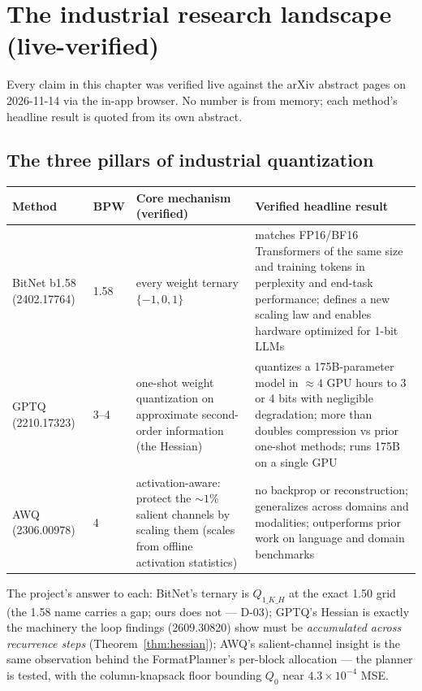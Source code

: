 \chapter{The industrial research landscape (live-verified)}

Every claim in this chapter was verified live against the arXiv abstract pages on 2026-11-14
via the in-app browser. No number is from memory; each method's headline result is quoted
from its own abstract.

\section{The three pillars of industrial quantization}

\begin{tabular}{@{}p{2.1cm}p{1.1cm}p{4.6cm}p{6.4cm}@{}}
\toprule
Method & BPW & Core mechanism (verified) & Verified headline result \\
\midrule
BitNet b1.58 (2402.17764) & 1.58 & every weight ternary $\{-1,0,1\}$ & matches FP16/BF16
Transformers of the same size and training tokens in perplexity and end-task performance;
defines a new scaling law and enables hardware optimized for 1-bit LLMs \\
GPTQ (2210.17323) & 3--4 & one-shot weight quantization on approximate second-order
information (the Hessian) & quantizes a 175B-parameter model in ${\approx}4$ GPU hours to 3
or 4 bits with negligible degradation; more than doubles compression vs prior one-shot
methods; runs 175B on a single GPU \\
AWQ (2306.00978) & 4 & activation-aware: protect the ${\sim}1\%$ salient channels by scaling
them (scales from offline activation statistics) & no backprop or reconstruction; generalizes
across domains and modalities; outperforms prior work on language and domain benchmarks \\
\bottomrule
\end{tabular}

\medskip
The project's answer to each: BitNet's ternary is $Q_{1\_K\_H}$ at the exact 1.50 grid (the
1.58 name carries a gap; ours does not --- D-03); GPTQ's Hessian is exactly the machinery the
loop findings (2609.30820) show must be \emph{accumulated across recurrence steps}
(Theorem~\ref{thm:hessian}); AWQ's salient-channel insight is the same observation behind the
FormatPlanner's per-block allocation --- the planner is tested, with the column-knapsack floor
bounding $Q_0$ near $4.3\times10^{-4}$ MSE.

